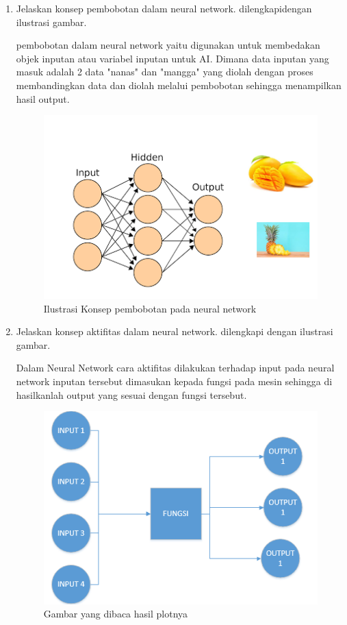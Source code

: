 \begin{enumerate}
\item Jelaskan konsep pembobotan  dalam neural network. dilengkapidengan ilustrasi gambar. \par
pembobotan dalam neural network yaitu digunakan untuk membedakan objek inputan atau 
variabel inputan untuk AI. Dimana data inputan yang masuk adalah 2 data "nanas" dan "mangga" 
yang diolah dengan proses membandingkan data dan diolah melalui pembobotan sehingga menampilkan hasil output.

\begin{figure}[ht]
\centering
\includegraphics[scale=0.5]{figures/1174003/chapter6/1,3.PNG}
\caption{Ilustrasi Konsep pembobotan pada neural network}
\label{contoh}
\end{figure}

\item Jelaskan konsep aktifitas dalam neural network. dilengkapi dengan ilustrasi gambar.\par
Dalam Neural Network cara aktifitas dilakukan terhadap input pada neural network inputan tersebut dimasukan kepada 
fungsi pada mesin sehingga di hasilkanlah output yang sesuai dengan fungsi tersebut.

\begin{figure}[ht]
\centering
\includegraphics[scale=0.5]{figures/1174003/chapter6/1,4.PNG}
\caption{Gambar yang dibaca hasil plotnya}
\label{contoh}
\end{figure}


\end{enumerate}

